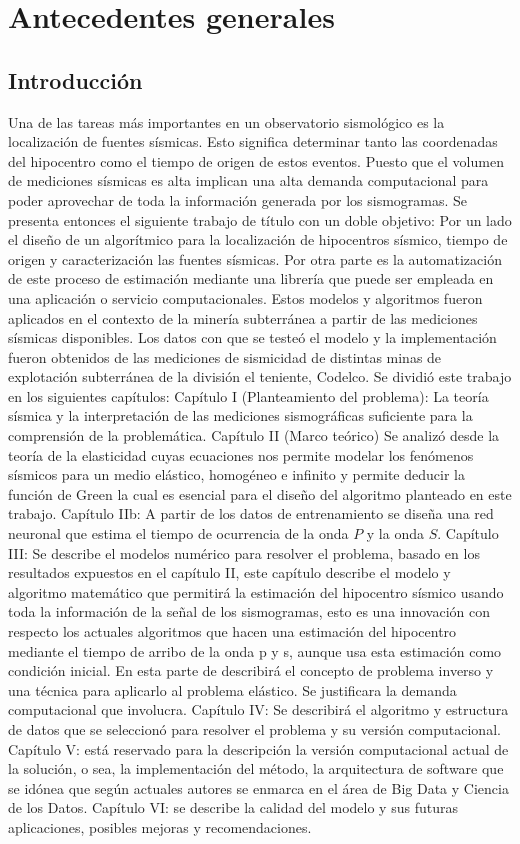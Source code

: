 
\chapter{Antecedentes generales}

\section{Introducción}

Una de las tareas más importantes en un observatorio sismológico es la
localización de fuentes sísmicas. Esto significa determinar tanto las
coordenadas del hipocentro como el tiempo de origen de estos eventos. Puesto
que el volumen de mediciones sísmicas es alta implican una alta demanda
computacional para poder aprovechar de toda la información generada por los
sismogramas.
Se presenta entonces el siguiente trabajo de título con un doble objetivo: Por
un lado el diseño  de un algorítmico para la localización de hipocentros
sísmico, tiempo de origen y caracterización las fuentes sísmicas. Por otra parte es la
automatización de este proceso de estimación mediante una librería que puede ser
empleada en una aplicación o servicio computacionales.
Estos modelos y algoritmos fueron aplicados en el contexto de la minería
subterránea a partir de las mediciones sísmicas disponibles. Los datos con
que se testeó el modelo y la implementación fueron obtenidos de las mediciones
de sismicidad de distintas minas de explotación subterránea de la división el
teniente, Codelco.
Se dividió este trabajo en los siguientes capítulos:
Capítulo I (Planteamiento del problema): La teoría sísmica y la interpretación
de las mediciones sismográficas suficiente para la comprensión de la problemática.
Capítulo II (Marco teórico) Se analizó desde la teoría de la elasticidad cuyas
ecuaciones nos permite modelar los fenómenos sísmicos para un medio elástico, homogéneo e
infinito y permite deducir la función de Green la cual es esencial para el
diseño del algoritmo planteado en este trabajo.
Capítulo IIb: A partir de los datos de entrenamiento se diseña una red neuronal
que estima el tiempo de ocurrencia de la onda $P$ y la onda $S$.
Capítulo III: Se describe el modelos numérico para resolver el problema, basado
en los resultados expuestos en el capítulo II, este capítulo describe el modelo
y algoritmo matemático que permitirá la estimación del hipocentro sísmico usando
toda la información de la señal de los sismogramas, esto es una innovación con
respecto los actuales algoritmos que hacen una estimación del hipocentro
mediante el tiempo de arribo de la onda p y s, aunque usa esta estimación como
condición inicial. En esta parte de describirá el concepto de problema inverso y
una técnica para aplicarlo al problema elástico. Se justificara la demanda
computacional que involucra.
Capítulo IV: Se describirá el algoritmo y estructura de datos que se seleccionó
para resolver el problema y su versión computacional.
Capítulo V: está reservado para la descripción la versión computacional actual
de la solución, o sea, la implementación del método, la arquitectura de software
que se idónea que  según actuales autores se enmarca en el área de Big Data y
Ciencia de los Datos.
Capítulo VI: se describe la calidad del modelo y sus futuras aplicaciones,
posibles mejoras y recomendaciones.

